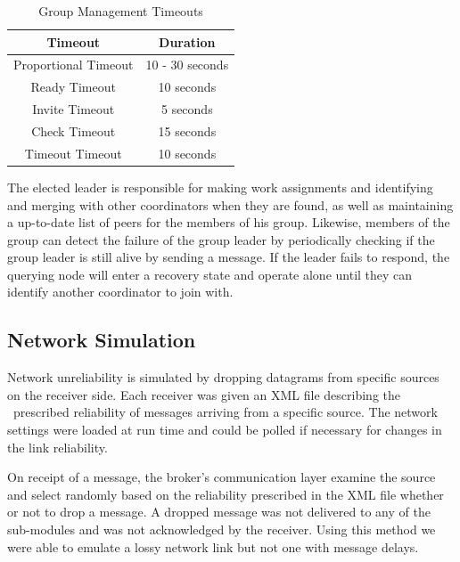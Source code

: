 \documentclass{llncs}
\begin{document}
\begin{table}
\caption{Group Management Timeouts}
\label{Table:Timeouts}
\centering
\begin{tabular}{ c c }
\hline
Timeout & Duration \\ \hline \hline
Proportional Timeout & 10 - 30 seconds \\ \hline
Ready Timeout & 10 seconds \\ \hline
Invite Timeout & 5 seconds \\ \hline
Check Timeout & 15 seconds \\ \hline
Timeout Timeout & 10 seconds \\ \hline
\end{tabular}
\end{table}


The elected leader is responsible for making work assignments and identifying and merging with other coordinators when they are found, as well as maintaining a up-to-date list of peers for the members of his group.  Likewise, members of the group can detect the failure of the group leader by periodically checking if the group leader is still alive by sending a message. If the leader fails to respond, the querying node will enter a recovery state and operate alone until they can identify another coordinator to join with.
\subsection{Network Simulation}

Network unreliability is simulated by dropping datagrams from specific sources on the receiver side. Each receiver was given an XML file describing the  prescribed reliability of messages arriving from a specific source. The network settings were loaded at run time and could be polled if necessary for changes in the link reliability.

On receipt of a message, the broker's communication layer examine the source and select randomly based on the reliability prescribed in the XML file whether or not to drop a message. A dropped message was not delivered to any of the sub-modules and was not acknowledged by the receiver. Using this method we were able to emulate a lossy network link but not one with message delays.
\end{document}
